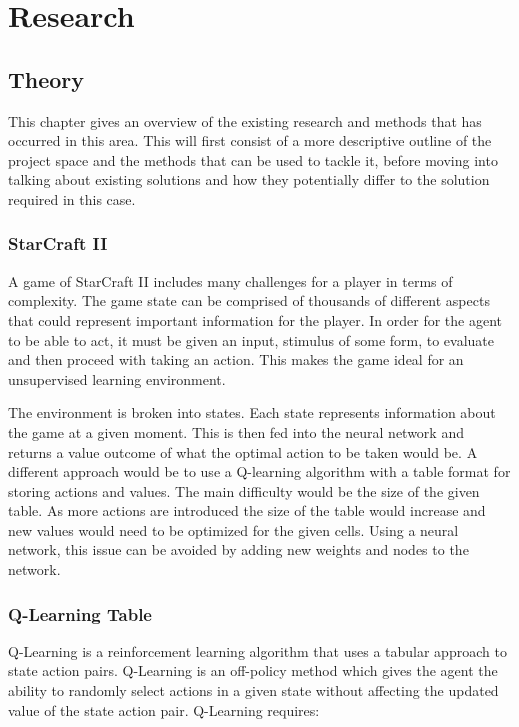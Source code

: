 \chapter{Research}%
\label{research}

\section{Theory}

This chapter gives an overview of the existing research and methods that
has occurred in this area. This will first consist of a more descriptive
outline of the project space and the methods that can be used to tackle it,
before moving into talking about existing solutions and how they potentially
differ to the solution required in this case.

\subsection{StarCraft II}

A game of StarCraft II includes many challenges for a player in terms of complexity.
The game state can be comprised of thousands of different aspects that could represent
important information for the player. In order for the agent to be able to act,
it must be given an input, stimulus of some form, to evaluate and then proceed with
taking an action. This makes the game ideal for an unsupervised learning environment.

The environment is broken into states. Each state represents information about
the game at a given moment. This is then fed into the neural network and
returns a value outcome of what the optimal action to be taken would be. A
different approach would be to use a Q-learning algorithm with a table format
for storing actions and values. The main difficulty would be the size of the
given table. As more actions are introduced the size of the table would
increase and new values would need to be optimized for the given cells. Using a
neural network, this issue can be avoided by adding new weights and nodes to the
network.

\subsection{Q-Learning Table}

Q-Learning is a reinforcement learning algorithm that uses a tabular approach to
state action pairs. Q-Learning is an off-policy method which gives the agent the
ability to randomly select actions in a given state without affecting the
updated value of the state action pair. Q-Learning requires:


